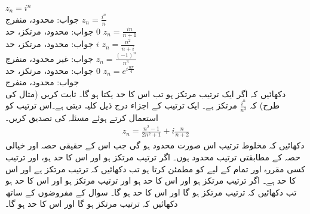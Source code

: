 \quad
$z_n=i^n$\\
جواب:\quad
محدود، منفرج
\quad
$z_n=\tfrac{i^n}{n}$\\
جواب:\quad
محدود، مرتکز، حد $0$
\quad
$z_n=\tfrac{in}{n+1}$\\
جواب:\quad
محدود، مرتکز، حد $i$
\quad
$z_n=\tfrac{n^2}{n+i}$\\
جواب:\quad
غیر محدود، منفرج
\quad
$z_n=\tfrac{(-1)^n}{n^3}$\\
جواب:\quad
محدود، مرتکز، حد $0$
\quad
$z_n=e^{i\tfrac{n\pi}{4}}$\\
جواب:\quad
محدود، منفرج
\quad {}\\
دکھائیں کہ اگر ایک ترتیب مرتکز ہو تب اس کا حد یکتا ہو گا۔
\quad
ثابت کریں (مثال  کی طرح) کہ 
$\tfrac{i^n}{n^3}$
مرتکز ہے۔
\quad
ایک ترتیب کے اجزاء درج ذیل کلیہ دیتی ہے۔اس ترتیب کو استعمال کرتے ہوئے مسئلہ  کی تصدیق کریں۔\\
\begin{align*}
z_n=\frac{n^2-1}{2n^2+1}+i\frac{n}{n+2}
\end{align*}
\quad
دکھائیں کہ مخلوط ترتیب  اس صورت محدود ہو گی جب اس کے حقیقی حصہ اور خیالی حصہ کے مطابقتی ترتیب محدود ہوں۔
\quad
اگر ترتیب  مرتکز ہو اور اس کا حد  ہو، اور ترتیب  کسی مقررہ  اور تمام  کے  لیے   کو مطمئن کرتا ہو تب دکھائیں کہ ترتیب  مرتکز ہے اور اس کا حد  ہے۔
\quad
اگر ترتیب  مرتکز ہو اور اس کا حد  ہو اور ترتیب  مرتکز ہو اور اس کا حد   ہو تب دکھائیں کہ ترتیب  مرتکز ہو گا اور اس کا حد  ہو گا۔
\quad
سوال  کے مفروضوں کے ساتھ دکھائیں کہ ترتیب   مرتکز ہو گا اور اس کا حد  ہو گا۔

